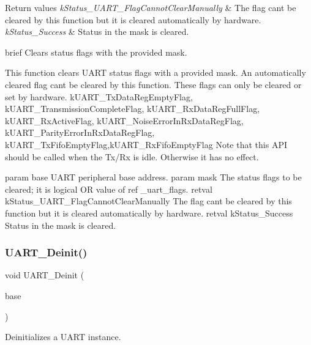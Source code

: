 \begin{DoxyRetVals}{Return values}
{\em k\+Status\+\_\+\+U\+A\+R\+T\+\_\+\+Flag\+Cannot\+Clear\+Manually} & The flag can\textquotesingle{}t be cleared by this function but it is cleared automatically by hardware. \\
\hline
{\em k\+Status\+\_\+\+Success} & Status in the mask is cleared.\\
\hline
\end{DoxyRetVals}
brief Clears status flags with the provided mask.

This function clears U\+A\+RT status flags with a provided mask. An automatically cleared flag can\textquotesingle{}t be cleared by this function. These flags can only be cleared or set by hardware. k\+U\+A\+R\+T\+\_\+\+Tx\+Data\+Reg\+Empty\+Flag, k\+U\+A\+R\+T\+\_\+\+Transmission\+Complete\+Flag, k\+U\+A\+R\+T\+\_\+\+Rx\+Data\+Reg\+Full\+Flag, k\+U\+A\+R\+T\+\_\+\+Rx\+Active\+Flag, k\+U\+A\+R\+T\+\_\+\+Noise\+Error\+In\+Rx\+Data\+Reg\+Flag, k\+U\+A\+R\+T\+\_\+\+Parity\+Error\+In\+Rx\+Data\+Reg\+Flag, k\+U\+A\+R\+T\+\_\+\+Tx\+Fifo\+Empty\+Flag,k\+U\+A\+R\+T\+\_\+\+Rx\+Fifo\+Empty\+Flag Note that this A\+PI should be called when the Tx/\+Rx is idle. Otherwise it has no effect.

param base U\+A\+RT peripheral base address. param mask The status flags to be cleared; it is logical OR value of ref \+\_\+uart\+\_\+flags. retval k\+Status\+\_\+\+U\+A\+R\+T\+\_\+\+Flag\+Cannot\+Clear\+Manually The flag can\textquotesingle{}t be cleared by this function but it is cleared automatically by hardware. retval k\+Status\+\_\+\+Success Status in the mask is cleared. \mbox{\label{group__uart__driver_ga3ff48bc211831be33e6fe5c50eb671a0}} 
\subsubsection{\texorpdfstring{UART\_Deinit()}{UART\_Deinit()}}
{\footnotesize\ttfamily void U\+A\+R\+T\+\_\+\+Deinit (\begin{DoxyParamCaption}\item[{\mbox{\hyperlink{struct_u_a_r_t___type}{U\+A\+R\+T\+\_\+\+Type}} $\ast$}]{base }\end{DoxyParamCaption})}



Deinitializes a U\+A\+RT instance. 

